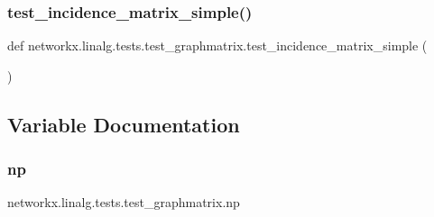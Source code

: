 \subsubsection{\texorpdfstring{test\+\_\+incidence\+\_\+matrix\+\_\+simple()}{test\_incidence\_matrix\_simple()}}
{\footnotesize\ttfamily def networkx.\+linalg.\+tests.\+test\+\_\+graphmatrix.\+test\+\_\+incidence\+\_\+matrix\+\_\+simple (\begin{DoxyParamCaption}{ }\end{DoxyParamCaption})}



\subsection{Variable Documentation}
\mbox{\label{namespacenetworkx_1_1linalg_1_1tests_1_1test__graphmatrix_af4e6ae46db2eb5e71b36874b48e8a7ce}} 
\subsubsection{\texorpdfstring{np}{np}}
{\footnotesize\ttfamily networkx.\+linalg.\+tests.\+test\+\_\+graphmatrix.\+np}

